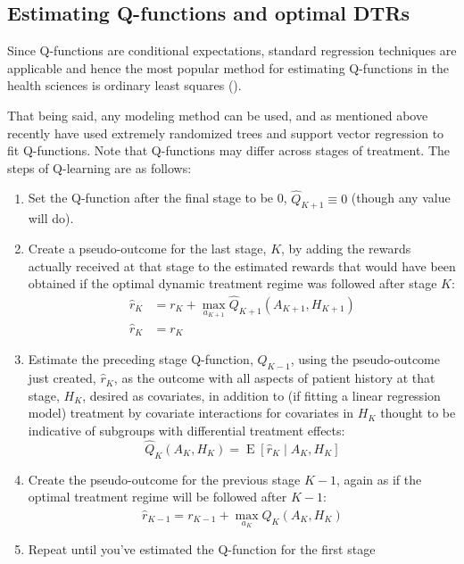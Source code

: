 \documentclass[12pt]{article}
\begin{document}
\subsection{Estimating Q-functions and optimal DTRs} %
\label{sub:estimating_q_functions}

Since Q-functions are conditional expectations, standard regression techniques are applicable and hence the most popular method for estimating Q-functions in the health sciences is ordinary least squares (\cite{dtr-review}).

That being said, any modeling method can be used, and as mentioned above recently \textcite{crt} have used extremely randomized trees and support vector regression to fit Q-functions. Note that Q-functions may differ across stages of treatment. The steps of Q-learning are as follows:

\begin{enumerate}
  \item Set the Q-function after the final stage to be 0, $\hat{Q}_{K+1} \equiv 0$ (though any value will do).
  \item Create a pseudo-outcome for the last stage, $K$, by adding the rewards actually received at that stage to the estimated rewards that would have been obtained if the optimal dynamic treatment regime was followed after stage $K$:
  \begin{align}
    \hat{r}_{K} &= r_{K} + \max_{a_{K+1}} \hat{Q}_{K+1}(A_{K+1}, H_{K+1}) \\
    \hat{r}_{K} &= r_{K}
  \end{align}
  \item Estimate the preceding stage Q-function, $Q_{K - 1}$, using the pseudo-outcome just created, $\hat{r}_{K}$, as the outcome with all aspects of patient history at that stage, $H_{K}$, desired as covariates, in addition to (if fitting a linear regression model) treatment by covariate interactions for covariates in $H_{K}$ thought to be indicative of subgroups with differential treatment effects:
  \begin{equation}
      \hat{Q}_{K}(A_{K}, H_{K}) = \operatorname{E}[\hat{r}_{K} \mid A_{K}, H_{K}]
  \end{equation}
  \item Create the pseudo-outcome for the previous stage $K - 1$, again as if the optimal treatment regime will be followed after $K - 1$:
  \begin{equation}
    \hat{r}_{K-1} = r_{K-1} + \max_{a_K} \hat{Q}_{K}(A_{K}, H_{K})
  \end{equation}
  \item Repeat until you've estimated the Q-function for the first stage
\end{enumerate}
\end{document}
